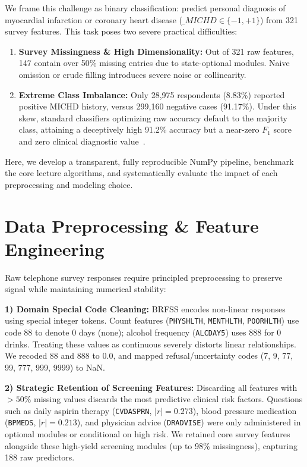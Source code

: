 \documentclass[10pt,conference,compsocconf]{IEEEtran}
\begin{document}
We frame this challenge as binary classification: predict personal diagnosis of myocardial infarction or coronary heart disease ($\_MICHD \in \{-1, +1\}$) from 321 survey features. This task poses two severe practical difficulties:
\begin{enumerate}
    \item \textbf{Survey Missingness \& High Dimensionality:} Out of 321 raw features, 147 contain over 50\% missing entries due to state-optional modules. Naive omission or crude filling introduces severe noise or collinearity.
    \item \textbf{Extreme Class Imbalance:} Only 28,975 respondents (8.83\%) reported positive MICHD history, versus 299,160 negative cases (91.17\%). Under this skew, standard classifiers optimizing raw accuracy default to the majority class, attaining a deceptively high 91.2\% accuracy but a near-zero $F_1$ score and zero clinical diagnostic value~\cite{he2009learning}.
\end{enumerate}
Here, we develop a transparent, fully reproducible NumPy pipeline, benchmark the core lecture algorithms, and systematically evaluate the impact of each preprocessing and modeling choice.

\section{Data Preprocessing \& Feature Engineering}
\label{sec:preprocessing}

Raw telephone survey responses require principled preprocessing to preserve signal while maintaining numerical stability:

\textbf{1) Domain Special Code Cleaning:} BRFSS encodes non-linear responses using special integer tokens. Count features (\texttt{PHYSHLTH}, \texttt{MENTHLTH}, \texttt{POORHLTH}) use code 88 to denote 0 days (none); alcohol frequency (\texttt{ALCDAY5}) uses 888 for 0 drinks. Treating these values as continuous severely distorts linear relationships. We recoded 88 and 888 to 0.0, and mapped refusal/uncertainty codes (7, 9, 77, 99, 777, 999, 9999) to NaN.

\textbf{2) Strategic Retention of Screening Features:} Discarding all features with $>50\%$ missing values discards the most predictive clinical risk factors. Questions such as daily aspirin therapy (\texttt{CVDASPRN}, $|r|=0.273$), blood pressure medication (\texttt{BPMEDS}, $|r|=0.213$), and physician advice (\texttt{DRADVISE}) were only administered in optional modules or conditional on high risk. We retained core survey features alongside these high-yield screening modules (up to 98\% missingness), capturing 188 raw predictors.
\end{document}
